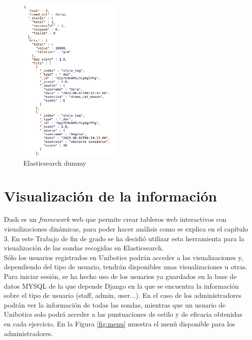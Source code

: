 \begin{figure}[H]
    \centering
    \includegraphics[width=5cm, keepaspectratio]{img/dummy.png}
    \caption{Elasticsearch dummy}
    \label{fig:dummy}
\end{figure}

\section{Visualización de la información}

Dash es un \textit{framework} web que permite crear tableros web interactivos con visualizaciones dinámicas, para poder hacer análisis como se explica en el capítulo 3. En este Trabajo de fin de grado se ha decidió utilizar esta herramienta para la visualización de las sondas recogidas en Elasticsearch.\\

Sólo los usuarios registrados en Unibotics podrán acceder a las visualizaciones y, dependiendo del tipo de usuario, tendrán disponibles unas visualizaciones u otras. Para iniciar sesión, se ha hecho uso de los usuarios ya guardados en la base de datos MYSQL de la que depende Django en la que se encuentra la información sobre el tipo de usuario (staff, admin, user...). En el caso de los administradores podrán ver la información de todas las sondas, mientras que un usuario de Unibotics solo podrá acceder a las puntuaciones de estilo y de eficacia obtenidas en cada ejercicio. En la Figura \ref{fig:menu} muestra el menú disponible para los administradores.

